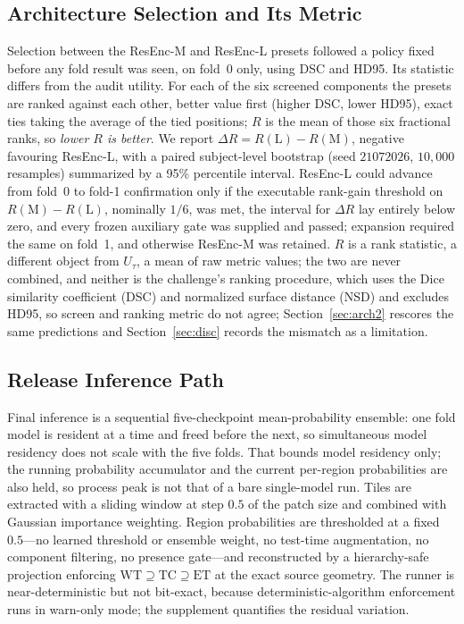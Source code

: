 \documentclass[runningheads]{llncs}
\begin{document}
\subsection{Architecture Selection and Its Metric}
\label{sec:arch}
Selection between the ResEnc-M and ResEnc-L presets followed a policy fixed before any fold result
was seen, on fold~0 only, using DSC and HD95. Its statistic differs from the audit utility. For each
of the six screened components the presets are ranked against each other, better value first (higher
DSC, lower HD95), exact ties taking the average of the tied positions; $R$ is the mean of those six
fractional ranks, so \emph{lower $R$ is better}. We report $\Delta R=R(\mathrm{L})-R(\mathrm{M})$,
negative favouring ResEnc-L, with a paired subject-level bootstrap (seed $21072026$, $10{,}000$
resamples) summarized by a 95\% percentile interval. ResEnc-L could advance from fold~0 to fold-1
confirmation only if the executable rank-gain threshold on $R(\mathrm{M})-R(\mathrm{L})$, nominally
$1/6$, was met, the interval for $\Delta R$ lay entirely below zero, and every frozen auxiliary gate
was supplied and passed; expansion required the same on fold~1, and otherwise ResEnc-M was
retained. $R$ is
a rank statistic, a different object from $U_\tau$, a mean of raw metric values; the two are never
combined, and neither is the challenge's ranking procedure, which uses the Dice similarity
coefficient (DSC) and normalized surface distance (NSD) and excludes HD95, so screen and ranking
metric do not agree;
Section~\ref{sec:arch2} rescores the same predictions and Section~\ref{sec:disc} records the
mismatch as a limitation.

\subsection{Release Inference Path}
Final inference is a sequential five-checkpoint mean-probability ensemble: one fold model is resident
at a time and freed before the next, so simultaneous model residency does not scale with the five
folds. That bounds model residency only; the running probability accumulator and the current
per-region probabilities are also held, so process peak is not that of a bare single-model run.
Tiles are extracted with a sliding window at step $0.5$ of the patch size and combined with Gaussian
importance weighting. Region probabilities
are thresholded at a fixed $0.5$---no learned threshold or ensemble weight, no test-time
augmentation, no component filtering, no presence gate---and reconstructed by a hierarchy-safe
projection enforcing $\mathrm{WT}\supseteq\mathrm{TC}\supseteq\mathrm{ET}$ at the exact source
geometry. The runner is near-deterministic but not bit-exact, because deterministic-algorithm
enforcement runs in warn-only mode; the supplement quantifies the residual variation.
\end{document}
